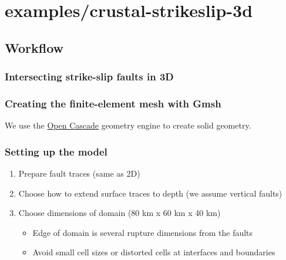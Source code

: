 \documentclass[aspectratio=169]{beamer}
\begin{document}
\section{{\ttfamily examples/crustal-strikeslip-3d}}
\subsection{Workflow}

\begin{frame}
  \frametitle{Intersecting strike-slip faults in 3D}

  
\end{frame}


\begin{frame}
  \frametitle{Creating the finite-element mesh with Gmsh}
  \summary{}

  We use the \href{https://dev.opencascade.org/}{Open Cascade} geometry engine to create solid geometry.
  
  
\end{frame}


\begin{frame}
  \frametitle{Setting up the model}
  \summary{}
  
  \begin{enumerate}
  \item Prepare fault traces (same as 2D)
  \item Choose how to extend surface traces to depth (we assume vertical faults)
  \item Choose dimensions of domain (80 km x 60 km x 40 km)
    \begin{itemize}
    \item Edge of domain is several rupture dimensions from the faults
    \item Avoid small cell sizes or distorted cells at interfaces and boundaries
    \end{itemize}
  \end{enumerate}
  
\end{frame}
\end{document}
